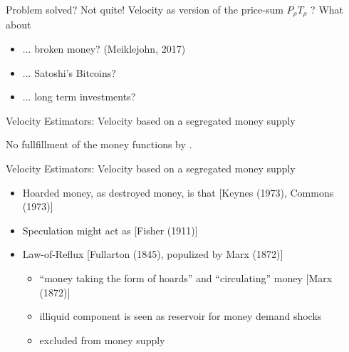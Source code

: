 \documentclass[]{beamer}
\begin{document}
\begin{frame}{Problem solved?}
  \vfill
  Not quite!
  \vfill
  Velocity as  version of the price-sum \(P_{\rho}T_{\rho}\) ?
  \vfill
  What about
  \begin{itemize}
  \item  ... broken money? (Meiklejohn, 2017) 
  \item  ... Satoshi's Bitcoins?
  \item  ... long term investments? 
  \end{itemize}
  \vfill
\end{frame}

\begin{frame}{Velocity Estimators: Velocity based on a segregated money supply}

  


  \vfill

  No fullfillment of the money functions by .

\end{frame}

\begin{frame}{Velocity Estimators: Velocity based on a segregated money supply}
  \begin{itemize}
  \item Hoarded money, as destroyed money, is  that  [Keynes (1973), Commons (1973)]
  \item Speculation might act as  [Fisher (1911)]
  \item Law-of-Reflux [Fullarton (1845), populized by Marx (1872)]%
    \begin{itemize}
    \item ``money taking the form of hoards'' and ``circulating'' money [Marx (1872)]
    \item illiquid component is seen as reservoir for money demand shocks
    \item excluded from money supply
    \end{itemize}
  \end{itemize}
\end{frame}
\end{document}
